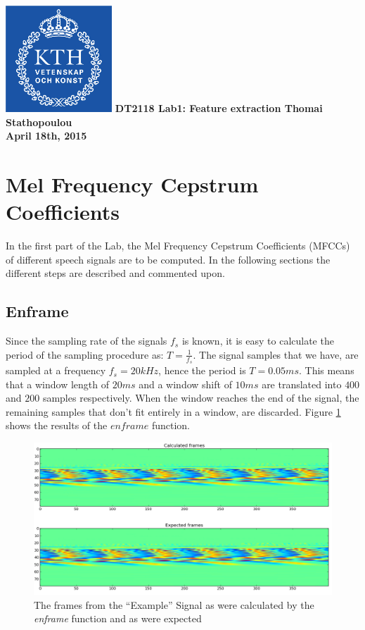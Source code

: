 \documentclass[12pt,a4paper,oneside]{article}
\begin{document}
\begin{titlepage}

\centering
	\includegraphics[width=4cm]{logo.jpg}
	\vfill
    {\bfseries\Large
        DT2118 Lab1: Feature extraction
        \vskip1cm
        Thomai Stathopoulou\\
        \vskip1cm
        April 18th, 2015
    }    
   \vfill
\end{titlepage}

\section{Mel Frequency Cepstrum Coefficients}

In the first part of the Lab, the Mel Frequency Cepstrum Coefficients (MFCCs) of different speech signals are to be computed. In the following sections the different steps are described and commented upon.

\subsection{Enframe}

Since the sampling rate of the signals $f_s$ is known, it is easy to calculate the period of the sampling procedure as: $T = \frac{1}{f_s}$. The signal samples that we have, are sampled at a frequency $f_s = 20kHz$, hence the period is $T = 0.05 ms$. This means that a window length of $20ms$ and a window shift of $10ms$ are translated into $400$ and $200$ samples respectively. When the window reaches the end of the signal, the remaining samples that don't fit entirely in a window, are discarded. Figure \ref{fig:frames} shows the results of the $enframe$ function.

\begin{figure}[h]
\includegraphics[scale=0.4]{../frames.png}
\caption{The frames from the ``Example'' Signal as were calculated by the \textit{enframe} function and as were expected}
\label{fig:frames}
\end{figure}
\end{document}

